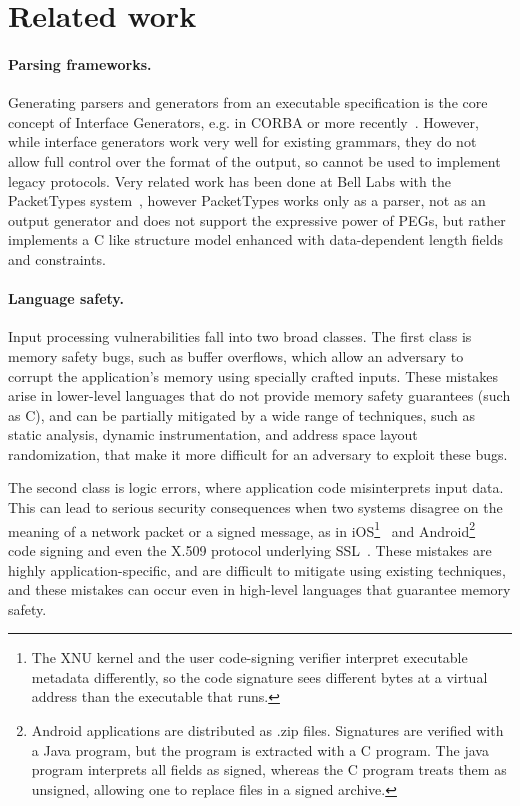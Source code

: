 \section{Related work}

\paragraph{Parsing frameworks.}

Generating parsers and generators from an executable specification
is the core concept of Interface Generators, e.g. in CORBA or more
recently~\cite{varda2008}. However, while interface generators work
very well for existing grammars, they do not allow full control over the
format of the output, so cannot be used to implement legacy protocols.
Very related work has been done at Bell Labs with the PacketTypes
system~\cite{mccann2000packet}, however PacketTypes works only as a
parser, not as an output generator and does not support the expressive
power of PEGs, but rather implements a C like structure model enhanced
with data-dependent length fields and constraints.

\paragraph{Language safety.}

Input processing vulnerabilities fall into two broad classes.  The first
class is memory safety bugs, such as buffer overflows, which allow an
adversary to corrupt the application's memory using specially crafted
inputs.  These mistakes arise in lower-level languages that do not
provide memory safety guarantees (such as C), and can be partially
mitigated by a wide range of techniques, such as static analysis,
dynamic instrumentation, and address space layout randomization, that
make it more difficult for an adversary to exploit these bugs.

The second class is logic errors, where application code misinterprets
input data.  This can lead to serious security consequences when two
systems disagree on the meaning of a network packet or a signed message,
as in iOS\footnote{The XNU kernel and the user code-signing verifier
interpret executable metadata differently, so the code signature
sees different bytes at a virtual address than the executable that
runs.}~\cite{evaders6} and Android\footnote{Android applications
are distributed as .zip files. Signatures are verified with a Java
program, but the program is extracted with a C program.  The java
program interprets all fields as signed, whereas the C program
treats them as unsigned, allowing one to replace files in a signed
archive.}~\cite{saurik-masterkey} code signing and even the X.509 protocol
underlying SSL~\cite{DBLP:conf/fc/KaminskyPS10}.  These mistakes are
highly application-specific, and are difficult to mitigate using existing
techniques, and these mistakes can occur even in high-level languages
that guarantee memory safety.


